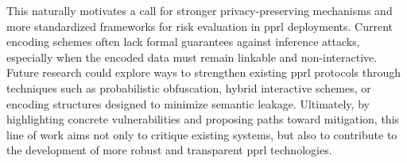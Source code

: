This naturally motivates a call for stronger privacy-preserving mechanisms and more standardized frameworks for risk evaluation in \ac{pprl} deployments.
Current encoding schemes often lack formal guarantees against inference attacks, especially when the encoded data must remain linkable and non-interactive.
Future research could explore ways to strengthen existing \ac{pprl} protocols through techniques such as probabilistic obfuscation, hybrid interactive schemes, or encoding structures designed to minimize semantic leakage.
Ultimately, by highlighting concrete vulnerabilities and proposing paths toward mitigation, this line of work aims not only to critique existing systems, but also to contribute to the development of more robust and transparent \ac{pprl} technologies.





